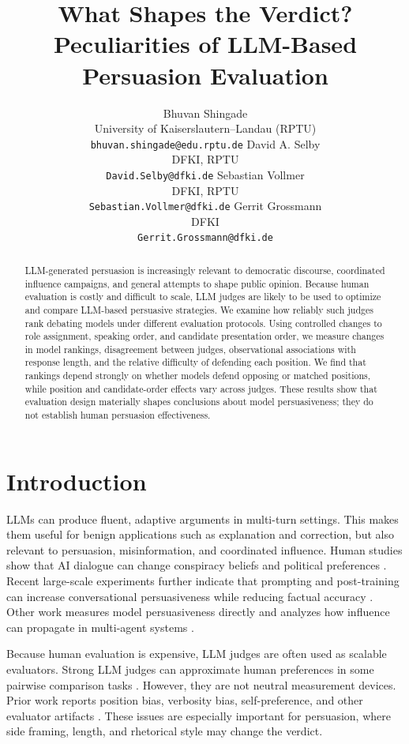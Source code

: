 \documentclass{article}
\title{What Shapes the Verdict?\\Peculiarities of LLM-Based Persuasion Evaluation}
\author{
  Bhuvan Shingade\\
  University of Kaiserslautern--Landau (RPTU)\\
\texttt{bhuvan.shingade@edu.rptu.de}
  \And
  David A. Selby\\
  DFKI, RPTU\\
\texttt{David.Selby@dfki.de}
  \And
  Sebastian Vollmer\\
  DFKI, RPTU\\
\texttt{Sebastian.Vollmer@dfki.de}
  \And
  Gerrit Grossmann\\
  DFKI\\
\texttt{Gerrit.Grossmann@dfki.de} }
\begin{document}
\maketitle


\begin{abstract}
LLM-generated persuasion is increasingly relevant to democratic discourse, coordinated influence campaigns, and general attempts to shape public opinion. Because human evaluation is costly and difficult to scale, LLM judges are likely to be used to optimize and compare LLM-based persuasive strategies. We examine how reliably such judges rank debating models under different evaluation protocols. Using controlled changes to role assignment, speaking order, and candidate presentation order, we measure changes in model rankings, disagreement between judges, observational associations with response length, and the relative difficulty of defending each position. We find that rankings depend strongly on whether models defend opposing or matched positions, while position and candidate-order effects vary across judges. These results show that evaluation design materially shapes conclusions about model persuasiveness; they do not establish human persuasion effectiveness.
\end{abstract}

\section{Introduction}

LLMs can produce fluent, adaptive arguments in multi-turn settings. This makes them useful for benign applications such as explanation and correction, but also relevant to persuasion, misinformation, and coordinated influence. Human studies show that AI dialogue can change conspiracy beliefs and political preferences \citep{costello2024conspiracy,lin2025voters}. Recent large-scale experiments further indicate that prompting and post-training can increase conversational persuasiveness while reducing factual accuracy \citep{hackenburg2025levers}. Other work measures model persuasiveness directly \citep{durmus2024persuasiveness,singh2024persuasionbench} and analyzes how influence can propagate in multi-agent systems \citep{abedini2026stubborn}.

Because human evaluation is expensive, LLM judges are often used as scalable evaluators. Strong LLM judges can approximate human preferences in some pairwise comparison tasks \citep{zheng2023judge}. However, they are not neutral measurement devices. Prior work reports position bias, verbosity bias, self-preference, and other evaluator artifacts \citep{wang2024faireval,shi2024positionbias,panickssery2024selfpreference,chen2024judgementbias}. These issues are especially important for persuasion, where side framing, length, and rhetorical style may change the verdict.
\end{document}
